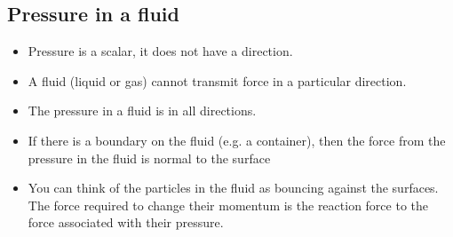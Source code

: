 \documentclass[aspectratio=169,
hyperref={colorlinks,urlcolor=blue}
]{beamer}
\begin{document}
\subsection{Pressure in a fluid}
\label{subsec:pressureinafluid}
{
\begin{itemize}
\item Pressure is a scalar, it does not have a direction.
\item A fluid (liquid or gas) cannot transmit force in a particular direction.
\item The pressure in a fluid is in all directions.
\item If there is a boundary on the fluid (e.g. a container), then the force from the pressure in the fluid is normal to the surface
\item You can think of the particles in the fluid as bouncing against the surfaces. The force required to change their momentum is the reaction force to the force associated with their pressure.
\end{itemize}
}
\end{document}
